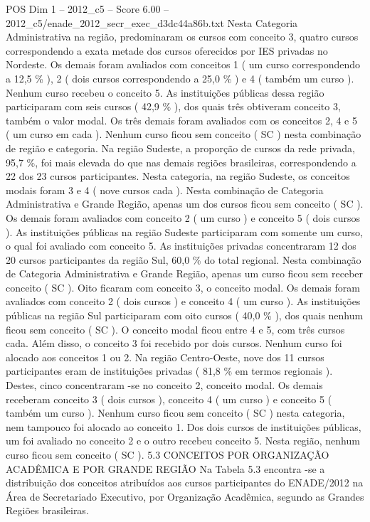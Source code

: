 \begin{textsample}{POS Dim 1 – 2012\_c5 – Score 6.00 – 2012\_c5/enade\_2012\_secr\_exec\_d3dc44a86b.txt}
Nesta Categoria Administrativa na região, predominaram os cursos com conceito 3, quatro cursos correspondendo a exata metade dos cursos oferecidos por IES privadas no Nordeste.
Os demais foram avaliados com conceitos 1 ( um curso correspondendo a 12,5 \% ), 2 ( dois cursos correspondendo a 25,0 \% ) e 4 ( também um curso ).
Nenhum curso recebeu o conceito 5.
As instituições públicas dessa região participaram com seis cursos ( 42,9 \% ), dos quais três obtiveram conceito 3, também o valor modal.
Os três demais foram avaliados com os conceitos 2, 4 e 5 ( um curso em cada ).
Nenhum curso ficou sem conceito ( SC ) nesta combinação de região e categoria.
Na região Sudeste, a proporção de cursos da rede privada, 95,7 \%, foi mais elevada do que nas demais regiões brasileiras, correspondendo a 22 dos 23 cursos participantes.
Nesta categoria, na região Sudeste, os conceitos modais foram 3 e 4 ( nove cursos cada ).
Nesta combinação de Categoria Administrativa e Grande Região, apenas um dos cursos ficou sem conceito ( SC ).
Os demais foram avaliados com conceito 2 ( um curso ) e conceito 5 ( dois cursos ).
As instituições públicas na região Sudeste participaram com somente um curso, o qual foi avaliado com conceito 5.
As instituições privadas concentraram 12 dos 20 cursos participantes da região Sul, 60,0 \% do total regional.
Nesta combinação de Categoria Administrativa e Grande Região, apenas um curso ficou sem receber conceito ( SC ).
Oito ficaram com conceito 3, o conceito modal.
Os demais foram avaliados com conceito 2 ( dois cursos ) e conceito 4 ( um curso ).
As instituições públicas na região Sul participaram com oito cursos ( 40,0 \% ), dos quais nenhum ficou sem conceito ( SC ).
O conceito modal ficou entre 4 e 5, com três cursos cada.
Além disso, o conceito 3 foi recebido por dois cursos.
Nenhum curso foi alocado aos conceitos 1 ou 2.
Na região Centro-Oeste, nove dos 11 cursos participantes eram de instituições privadas ( 81,8 \% em termos regionais ).
Destes, cinco concentraram -se no conceito 2, conceito modal.
Os demais receberam conceito 3 ( dois cursos ), conceito 4 ( um curso ) e conceito 5 ( também um curso ).
Nenhum curso ficou sem conceito ( SC ) nesta categoria, nem tampouco foi alocado ao conceito 1.
Dos dois cursos de instituições públicas, um foi avaliado no conceito 2 e o outro recebeu conceito 5.
Nesta região, nenhum curso ficou sem conceito ( SC ). 5.3 CONCEITOS POR ORGANIZAÇÃO ACADÊMICA E POR GRANDE REGIÃO Na Tabela 5.3 encontra -se a distribuição dos conceitos atribuídos aos cursos participantes do ENADE/2012 na Área de Secretariado Executivo, por Organização Acadêmica, segundo as Grandes Regiões brasileiras.

\end{textsample}
